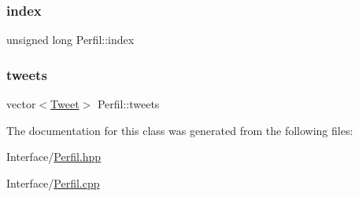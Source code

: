 \subsubsection{\texorpdfstring{index}{index}}
{\footnotesize\ttfamily unsigned long Perfil\+::index\hspace{0.3cm}{\ttfamily [private]}}

\mbox{\label{class_perfil_a8aec470bb6a319be9a3bf65795f825d7}} 
\subsubsection{\texorpdfstring{tweets}{tweets}}
{\footnotesize\ttfamily vector$<$\hyperlink{class_tweet}{Tweet}$>$ Perfil\+::tweets\hspace{0.3cm}{\ttfamily [private]}}



The documentation for this class was generated from the following files\+:\begin{DoxyCompactItemize}
\item 
Interface/\hyperlink{_perfil_8hpp}{Perfil.\+hpp}\item 
Interface/\hyperlink{_perfil_8cpp}{Perfil.\+cpp}\end{DoxyCompactItemize}

